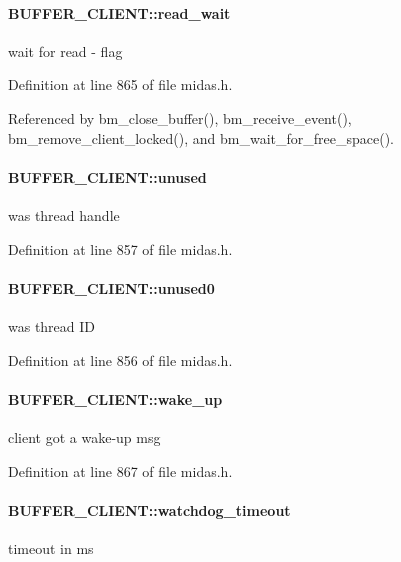 \paragraph[{read\_\-wait}]{ {\bf BUFFER\_\-CLIENT::read\_\-wait}}\hfill\label{structBUFFER__CLIENT_a896acd334d608006626fcca2a872a4a4}
wait for read -\/ flag 

Definition at line 865 of file midas.h.

Referenced by bm\_\-close\_\-buffer(), bm\_\-receive\_\-event(), bm\_\-remove\_\-client\_\-locked(), and bm\_\-wait\_\-for\_\-free\_\-space().
\paragraph[{unused}]{ {\bf BUFFER\_\-CLIENT::unused}}\hfill\label{structBUFFER__CLIENT_a1dfdc586ff9586685c8f3c57382e1e4d}
was thread handle 

Definition at line 857 of file midas.h.
\paragraph[{unused0}]{ {\bf BUFFER\_\-CLIENT::unused0}}\hfill\label{structBUFFER__CLIENT_a0368d60206a1130f3ed93b9b84934738}
was thread ID 

Definition at line 856 of file midas.h.
\paragraph[{wake\_\-up}]{ {\bf BUFFER\_\-CLIENT::wake\_\-up}}\hfill\label{structBUFFER__CLIENT_ab7cd08686cbc2ba474a623bffc174ac7}
client got a wake-\/up msg 

Definition at line 867 of file midas.h.
\paragraph[{watchdog\_\-timeout}]{ {\bf BUFFER\_\-CLIENT::watchdog\_\-timeout}}\hfill\label{structBUFFER__CLIENT_a7f9617db2284469ad91a33d3f3ae1447}
timeout in ms 

